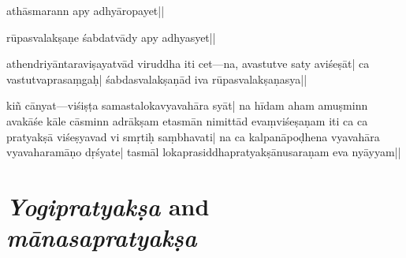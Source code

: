 athāsmarann apy adhyāropayet||

rūpasvalakṣaṇe śabdatvādy apy adhyasyet|| 

athendriyāntara\mde viṣayatvād  
viruddha iti cet---na, avastutve %
saty aviśeṣāt|  ca vastutvaprasaṃgaḥ| śa\-bdasvalakṣaṇād iva rūpasvalakṣa\mde ṇasya||

ki\mds ñ cānyat---viśi\mde ṣṭa 
samastaloka\mds vya\-va\-hāra 
syāt| 
na hīdam aham amuṣminn avakāśe kāle cāsminn adrākṣam etasmān nimittād evaṃviśeṣaṇam iti ca  
ca \mde pratyakṣā viśeṣyavad vi smṛtiḥ saṃbhavati| 
na ca kalpa\mds nāpoḍhena vya\-va\-hāra\- %
vyavaharamāṇo dṛśyate| 
tasmāl lokaprasiddhapratyakṣānu\-saraṇa\-m eva nyāyyam||

\section{\emph{Yogipratyakṣa} and \emph{mānasapratyakṣa}}
